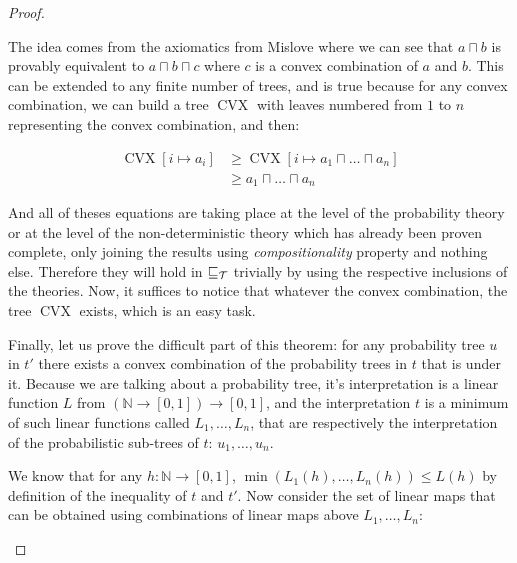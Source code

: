 \begin{proof}
\begin{enumerate}
            
            The idea comes from the axiomatics from Mislove
            \cite{mislove2004axioms} where we can see that $a \sqcap b$ is 
            provably equivalent to $a \sqcap b \sqcap c$ where $c$ is a convex
            combination of $a$ and $b$. This can be extended to any finite
            number of trees, and is true because for any convex combination, 
            we can build a tree $\operatorname{CVX}$ with leaves numbered from $1$ to $n$ 
            representing the convex combination, and then:

            \begin{align*}
                \operatorname{CVX}[i \mapsto a_i] &\geq \operatorname{CVX}[i \mapsto a_1 \sqcap \dots \sqcap
                a_n] \\
                                   &\geq a_1 \sqcap \dots \sqcap a_n
            \end{align*}
        
            And all of theses equations are taking place at the level of
            the probability theory 
            or at the level of the non-deterministic theory which has already been proven complete, 
            only joining the results using \emph{compositionality} property
            and nothing else. Therefore they will hold in $\sqsubseteq_\mathcal{T}$
            trivially by using the respective inclusions of the theories.
            Now, it suffices to notice that whatever the convex combination, 
            the tree $\operatorname{CVX}$ exists, which is an easy task. 

            Finally, let us prove the difficult part of this theorem: for any
            probability tree $u$ in $t'$ there exists a convex combination of 
            the probability trees in $t$ that is under it. Because we are
            talking about a probability tree, it's interpretation is a linear
            function $L$ from $(\mathbb{N} \to [0,1]) \to [0,1]$, and 
            the interpretation $t$ is a minimum of such linear functions
            called $L_1, \dots, L_n$, that are respectively the interpretation 
            of the probabilistic sub-trees of $t$: $u_1, \dots, u_n$.

            We know that for any $h : \mathbb{N} \to [0,1]$, 
            $\min (L_1 (h), \dots, L_n(h)) \leq L(h)$ by definition 
            of the inequality of $t$ and $t'$. Now consider 
            the set of linear maps that can be obtained using combinations 
            of linear maps above $L_1, \dots, L_n$:


\end{enumerate}
\end{proof}
